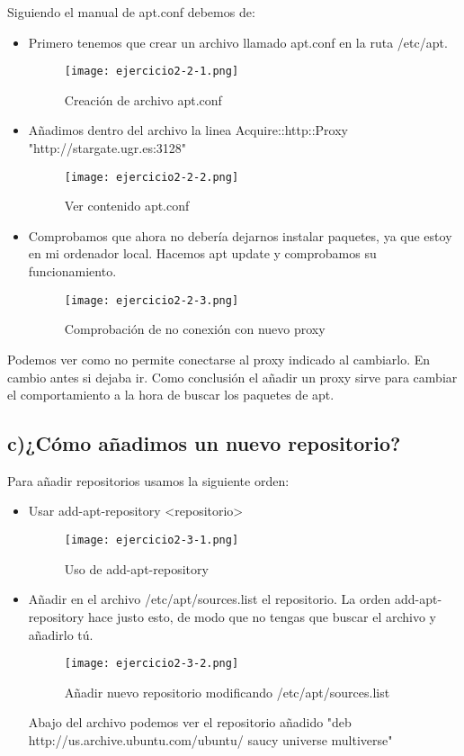 	Siguiendo el manual de apt.conf\cite{ejercicio2-2} debemos de:
	\begin{itemize}
		\item Primero tenemos que crear un archivo llamado apt.conf en la ruta /etc/apt.
		\begin{figure}[H] 
			\centering
			\texttt{[image: ejercicio2-2-1.png]} 
			\label{figura16} 
			
			\caption{Creación de archivo apt.conf}
		\end{figure}
		\item Añadimos dentro del archivo la linea Acquire::http::Proxy "http://stargate.ugr.es:3128"
		\begin{figure}[H] 
			\centering
			\texttt{[image: ejercicio2-2-2.png]} 
			\label{figura17} 
			
			\caption{Ver contenido apt.conf}
		\end{figure}
		\item Comprobamos que ahora no debería dejarnos instalar paquetes, ya que estoy en mi ordenador local. Hacemos apt update y comprobamos su funcionamiento.
			\begin{figure}[H] 
				\centering
				\texttt{[image: ejercicio2-2-3.png]} 
				\label{figura18} 
				
				\caption{Comprobación de no conexión con nuevo proxy}
			\end{figure}
	\end{itemize}
	
	Podemos ver como no permite conectarse al proxy indicado al cambiarlo. En cambio antes si dejaba ir. Como conclusión el añadir un proxy sirve para cambiar el comportamiento a la hora de buscar los paquetes de apt.
	
	\subsection{c)¿Cómo añadimos un nuevo repositorio?}
	
	Para añadir repositorios usamos la siguiente orden\cite{ejercicio2-3}: 
	\begin{itemize}
		\item Usar add-apt-repository <repositorio>
			\begin{figure}[H] 
				\centering
				\texttt{[image: ejercicio2-3-1.png]} 
				\label{figura19} 
				
				\caption{Uso de add-apt-repository}
			\end{figure}
		\item Añadir en el archivo /etc/apt/sources.list el repositorio. La orden add-apt-repository hace justo esto, de modo que no tengas que buscar el archivo y añadirlo tú.
			\begin{figure}[H] 
				\centering
				\texttt{[image: ejercicio2-3-2.png]} 
				\label{figura20} 
				
				\caption{Añadir nuevo repositorio modificando /etc/apt/sources.list}
			\end{figure}
		Abajo del archivo podemos ver el repositorio añadido "deb http://us.archive.ubuntu.com/ubuntu/ saucy universe multiverse"
	\end{itemize}
	

